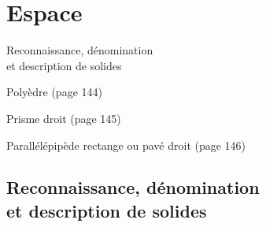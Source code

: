 \documentclass[a4paper,11pt]{report}
\begin{document}
\newcommand{\chapterName}{Espace}
\newcommand{\serieName}{Reconnaissance, dénomination \\ et description de solides}


\chapter*{\chapterName}
\thispagestyle{empty}

\begin{amL}{\serieName}{
\item Polyèdre (page 144)
\item Prisme droit (page 145)
\item Parallélépipède rectange ou pavé droit (page 146)}
\end{amL}
\section*{\serieName}
\setcounter{page}{1}
\thispagestyle{firstPage}



\end{document}
